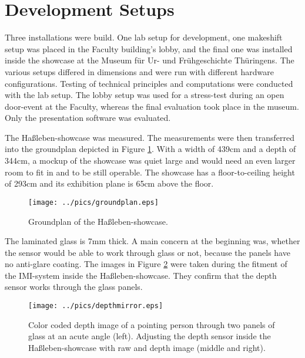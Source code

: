 
%


\section{Development Setups}
\label{setup_development}

Three installations were build. One lab setup for development, one makeshift setup was placed in the Faculty building's lobby, and the final one was installed inside the showcase at the Museum für Ur- und Frühgeschichte Thüringens. The various setups differed in dimensions and were run with different hardware configurations. Testing of technical principles and computations were conducted with the lab setup. The lobby setup was used for a stress-test during an open door-event at the Faculty, whereas the final evaluation took place in the museum. Only the presentation software was evaluated.

The Haßleben-showcase was measured. The measurements were then transferred into the groundplan depicted in Figure \ref{fig:hassleben_groundplan}. With a width of 439cm and a depth of 344cm, a mockup of the showcase was quiet large and would need an even larger room to fit in and to be still operable. The showcase has a floor-to-ceiling height of 293cm and its exhibition plane is 65cm above the floor.
\begin{figure}[H]%
\texttt{[image: ../pics/groundplan.eps]}%
\caption{Groundplan of the Haßleben-showcase.}%
\label{fig:hassleben_groundplan} %
\end{figure}

The laminated glass is 7mm thick. A main concern at the beginning was, whether the sensor would be able to work through glass or not, because the panels have no anti-glare coating. The images in Figure \ref{fig:hassleben_glass} were taken during the fitment of the \ac{IMI}-system inside the Haßleben-showcase. They confirm that the depth sensor works through the glass panels.
\begin{figure}[H]%
\texttt{[image: ../pics/depthmirror.eps]}%
\caption{Color coded depth image of a pointing person through two panels of glass at an acute angle (left). Adjusting the depth sensor inside the Haßleben-showcase with raw and depth image (middle and right).}%
\label{fig:hassleben_glass} %
\end{figure}

